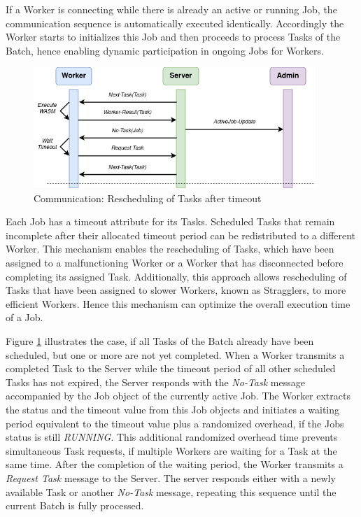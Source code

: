 If a Worker is connecting while there is already an active or running Job, the communication sequence is automatically executed identically. Accordingly the Worker starts to initializes this Job and then proceeds to process Tasks of the Batch, hence enabling dynamic participation in ongoing Jobs for Workers.

\begin{figure}[htbp]
    \centering
    \includegraphics[width=0.95\textwidth]{gfx/figures/communication-timeout.png}
    \caption{Communication: Rescheduling of Tasks after timeout}
    \label{fig:implementation:communication3}
\end{figure}

Each Job has a timeout attribute for its Tasks. Scheduled Tasks that remain incomplete after their allocated timeout period can be redistributed to a different Worker. This mechanism enables the rescheduling of Tasks, which have been assigned to a malfunctioning Worker or a Worker that has disconnected before completing its assigned Task. Additionally, this approach allows rescheduling of Tasks that have been assigned to slower Workers, known as Stragglers, to more efficient Workers. Hence this mechanism can optimize the overall execution time of a Job.

Figure \ref{fig:implementation:communication3} illustrates the case, if all Tasks of the Batch already have been scheduled, but one or more are not yet completed. When a Worker transmits a completed Task to the Server while the timeout period of all other scheduled Tasks has not expired, the Server responds with the \emph{No-Task} message accompanied by the Job object of the currently active Job. The Worker extracts the status and the timeout value from this Job objects and initiates a waiting period equivalent to the timeout value plus a randomized overhead, if the Jobs status is still \emph{RUNNING}. This additional randomized overhead time prevents simultaneous Task requests, if multiple Workers are waiting for a Task at the same time. After the completion of the waiting period, the Worker transmits a \emph{Request Task} message to the Server. The server responds either with a newly available Task or another \emph{No-Task} message, repeating this sequence until the current Batch is fully processed.

